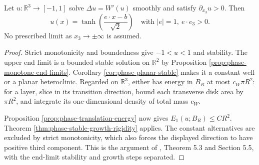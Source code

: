 \begin{theorem}\label{thm:phase-monotone-three-dimensional}
Let $u:\mathbb R^3\to[-1,1]$ solve $\Delta u=W'(u)$ smoothly and satisfy $\partial_{x_3}u>0$. Then
\[
 u(x)=\tanh\left(\frac{e\cdot x-b}{\sqrt2}\right)
 \quad\text{with }|e|=1,\ e\cdot e_3>0.
\]
No prescribed limit as $x_3\to\pm\infty$ is assumed.
\end{theorem}
\begin{proof}
Strict monotonicity and boundedness give $-1<u<1$ and stability. The upper end limit is a bounded stable solution on $\mathbb R^2$ by Proposition \ref{prop:phase-monotone-end-limits}. Corollary \ref{cor:phase-planar-stable} makes it a constant well or a planar heteroclinic. Regarded on $\mathbb R^3$, either has energy in $B_R$ at most $c_W\pi R^2$: for a layer, slice in its transition direction, bound each transverse disk area by $\pi R^2$, and integrate its one-dimensional density of total mass $c_W$.

Proposition \ref{prop:phase-translation-energy} now gives $E_1(u;B_R)\leq CR^2$. Theorem \ref{thm:phase-stable-growth-rigidity} applies. The constant alternatives are excluded by strict monotonicity, which also forces the displayed direction to have positive third component. This is the argument of \cite{ChAC}, Theorem 5.3 and Section 5.5, with the end-limit stability and growth steps separated.
\end{proof}
